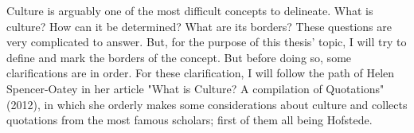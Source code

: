 \documentclass[../main.tex]{subfiles}
\begin{document}
\label{chap:3}



Culture is arguably one of the most difficult concepts to delineate. What is culture? How can it be determined? What are its borders? These questions are very complicated to answer. But, for the purpose of this thesis' topic, I will try to define and mark the borders of the concept. But before doing so, some clarifications are in order. For these clarification, I will follow the path of Helen Spencer-Oatey in her article "What is Culture? A compilation of Quotations"(2012), in which she orderly makes some considerations about culture and collects quotations from the most famous scholars; first of them all being Hofstede.
\end{document}
